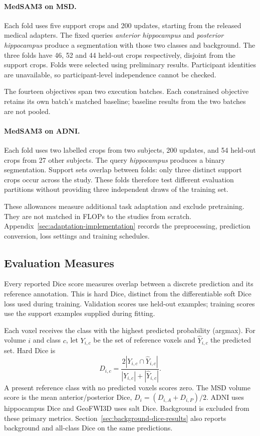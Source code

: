 \documentclass[12pt,a4paper]{article}
\begin{document}
\paragraph{MedSAM3 on MSD.}\label{sec:medsam-methods}
Each fold uses five support crops and 200 updates, starting from the
released medical adapters. The fixed queries \emph{anterior hippocampus}
and \emph{posterior hippocampus} produce a segmentation with those two
classes and background. The three folds have 46, 52 and 44 held-out
crops respectively, disjoint from the support crops. Folds were selected
using preliminary results. Participant identities are unavailable, so
participant-level independence cannot be checked.

The fourteen objectives span two execution batches. Each constrained
objective retains its own batch's matched baseline; baseline results
from the two batches are not pooled.

\paragraph{MedSAM3 on ADNI.}\label{sec:medsam-adni-methods}
Each fold uses two labelled crops from two subjects, 200 updates, and
54 held-out crops from 27 other subjects. The query \emph{hippocampus}
produces a binary segmentation. Support sets overlap between folds:
only three distinct support crops occur across the study. These folds
therefore test different evaluation partitions without providing
three independent draws of the training set.

These allowances measure additional task adaptation and exclude
pretraining. They are not matched in FLOPs to the studies from scratch.
Appendix~\ref{sec:adaptation-implementation} records the preprocessing,
prediction conversion, loss settings and training schedules.

\subsection{Evaluation Measures}
\label{sec:evaluation-methods}

Every reported Dice score measures overlap between a discrete
prediction and its reference annotation. This is hard Dice, distinct
from the differentiable soft Dice loss used during training.
Validation scores use held-out examples; training scores use the
support examples supplied during fitting.

Each voxel receives the class with the highest predicted probability
(argmax). For volume $i$ and class $c$, let $Y_{i,c}$ be the set of
reference voxels and $\widehat Y_{i,c}$ the predicted set. Hard Dice is
\begin{equation}
 D_{i,c}=\frac{2|Y_{i,c}\cap\widehat Y_{i,c}|}
 {|Y_{i,c}|+|\widehat Y_{i,c}|}.
\label{eq:reported-hard-dice}
\end{equation}
A present reference class with no predicted voxels scores zero.
The MSD volume score is the mean anterior/posterior Dice,
$D_i=(D_{i,A}+D_{i,P})/2$. ADNI uses hippocampus Dice and GeoFWI3D
uses salt Dice.
Background is excluded from these primary metrics.
Section~\ref{sec:background-dice-results} also reports background and
all-class Dice on the same predictions.
\end{document}
